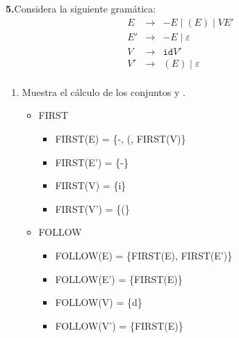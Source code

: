 \textbf{5.}Considera la siguiente gram\'atica:
\[
    \begin{array}{rcl}
        E & \to & -E \mid (E) \mid VE'\\
        E' & \to & -E \mid \varepsilon\\
        V & \to & \mathtt{id}V'\\
        V' & \to & (E) \mid \varepsilon\\
    \end{array}
\]
\begin{enumerate}

    \item Muestra el c\'alculo de los conjuntos {\ffst} y {\ffollow}.

        \begin{itemize}

            \item FIRST

            \begin{itemize}

                \item FIRST(E) = \{-, (, FIRST(V)\}

                \item FIRST(E') = \{-\}

                \item FIRST(V) = \{i\}

                \item FIRST(V') = \{(\}

            \end{itemize}

            \item FOLLOW

            \begin{itemize}

                \item FOLLOW(E) = \{FIRST(E), FIRST(E')\}

                \item FOLLOW(E') = \{FIRST(E)\}

                \item FOLLOW(V) = \{d\}

                \item FOLLOW(V') = \{FIRST(E)\}

            \end{itemize}

        \end{itemize}


\end{enumerate}
